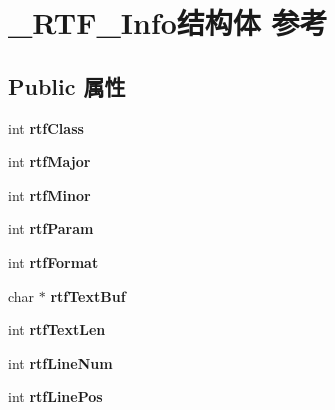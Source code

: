 \hypertarget{struct___r_t_f___info}{}\section{\+\_\+\+R\+T\+F\+\_\+\+Info结构体 参考}
\label{struct___r_t_f___info}
\subsection*{Public 属性}
\begin{DoxyCompactItemize}
\item 
\mbox{\label{struct___r_t_f___info_ab09e01726e43669132454460e64fbc68}} 
int {\bfseries rtf\+Class}
\item 
\mbox{\label{struct___r_t_f___info_a76ef1985d3ae30d0973a040b3c5a2bb9}} 
int {\bfseries rtf\+Major}
\item 
\mbox{\label{struct___r_t_f___info_a751b4dca31aefd7ba6a2b562ac93d7c1}} 
int {\bfseries rtf\+Minor}
\item 
\mbox{\label{struct___r_t_f___info_a544390beb9e5a3e0497a6a8fa12d5b8b}} 
int {\bfseries rtf\+Param}
\item 
\mbox{\label{struct___r_t_f___info_a85f824540457723749cba918a3dc0b45}} 
int {\bfseries rtf\+Format}
\item 
\mbox{\label{struct___r_t_f___info_a0409d0b13e5ac1ffc2a93eee63ca9a2f}} 
char $\ast$ {\bfseries rtf\+Text\+Buf}
\item 
\mbox{\label{struct___r_t_f___info_aeb7c57939aef942091f65626422b217b}} 
int {\bfseries rtf\+Text\+Len}
\item 
\mbox{\label{struct___r_t_f___info_a6940d31790424191b1bdf71a9b92f493}} 
int {\bfseries rtf\+Line\+Num}
\item 
\mbox{\label{struct___r_t_f___info_ac6bbcc0717b99fde72afcb93f94c8afd}} 
int {\bfseries rtf\+Line\+Pos}
\item 

\end{DoxyCompactItemize}
